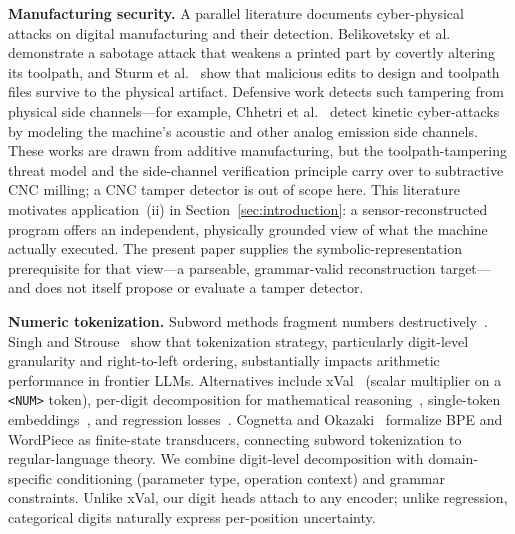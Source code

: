 \documentclass[sensors,article,submit,moreauthors,pdftex]{Definitions/mdpi}
\begin{document}
\textbf{Manufacturing security.}
A parallel literature documents cyber-physical attacks on digital manufacturing and their detection. Belikovetsky et al.~\cite{belikovetsky_drowned} demonstrate a sabotage attack that weakens a printed part by covertly altering its toolpath, and Sturm et al.~\cite{sturm_stl} show that malicious edits to design and toolpath files survive to the physical artifact. Defensive work detects such tampering from physical side channels---for example, Chhetri et al.~\cite{chhetri_kcad} detect kinetic cyber-attacks by modeling the machine's acoustic and other analog emission side channels. These works are drawn from additive manufacturing, but the toolpath-tampering threat model and the side-channel verification principle carry over to subtractive CNC milling; a CNC tamper detector is out of scope here. This literature motivates application~(ii) in Section~\ref{sec:introduction}: a sensor-reconstructed program offers an independent, physically grounded view of what the machine actually executed. The present paper supplies the symbolic-representation prerequisite for that view---a parseable, grammar-valid reconstruction target---and does not itself propose or evaluate a tamper detector.

\textbf{Numeric tokenization.}
Subword methods fragment numbers destructively~\cite{nogueira_numbers}. Singh and Strouse~\cite{tokenization_counts} show that tokenization strategy, particularly digit-level granularity and right-to-left ordering, substantially impacts arithmetic performance in frontier LLMs. Alternatives include xVal~\cite{xval} (scalar multiplier on a \texttt{<NUM>} token), per-digit decomposition for mathematical reasoning~\cite{digit_token}, single-token embeddings~\cite{single_token_numbers}, and regression losses~\cite{regress_dont_guess}. Cognetta and Okazaki~\cite{tokenization_fst} formalize BPE and WordPiece as finite-state transducers, connecting subword tokenization to regular-language theory. We combine digit-level decomposition with domain-specific conditioning (parameter type, operation context) and grammar constraints. Unlike xVal, our digit heads attach to any encoder; unlike regression, categorical digits naturally express per-position uncertainty.
\end{document}
